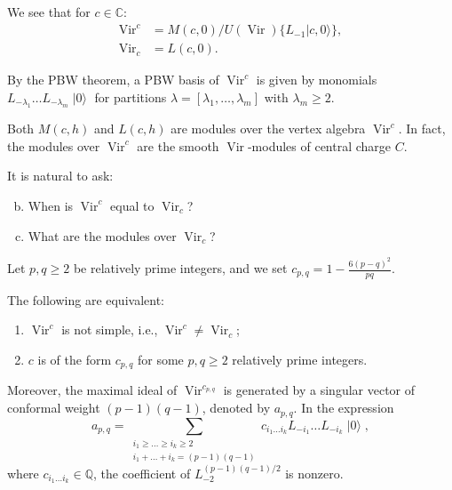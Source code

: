 \documentclass{beamer}
\DeclareMathOperator{\Vir}{Vir}
\DeclareMathOperator{\vac}{|0\rangle}
\begin{document}
\begin{frame}

  We see that for $c \in \mathbb{C}$:
  \begin{align*}
    \Vir^c &= M(c, 0)/U(\Vir)\{L_{-1}|c, 0\rangle\}, \\
    \Vir_c &= L(c, 0).
  \end{align*}

  By the PBW theorem, a PBW basis of $\Vir^c$ is given by monomials $L_{-\lambda_1}\dots L_{-\lambda_m}\vac$ for partitions $\lambda = [\lambda_1, \dots, \lambda_m]$ with $\lambda_m \ge 2$.

  \begin{example}[Modules over $\Vir^c$]
    \label{exa:2}
    Both $M(c, h)$ and $L(c, h)$ are modules over the vertex algebra $\Vir^c$.
    In fact, the modules over $\Vir^c$ are the smooth $\Vir$-modules of central charge $C$.
  \end{example}

  It is natural to ask:
  \begin{enumerate}[(a)]
    \setcounter{enumi}{1}
  \item When is $\Vir^c$ equal to $\Vir_c$?
  \item What are the modules over $\Vir_c$?
  \end{enumerate}

\end{frame}

\begin{frame}

  Let $p, q \ge 2$ be relatively prime integers, and we set $c_{p, q} = 1 - \frac{6(p - q)^2}{pq}$.

  \begin{theorem}
    \label{thr:3}
    The following are equivalent:
    \begin{enumerate}
    \item $\Vir^c$ is not simple, i.e., $\Vir^c \neq \Vir_c$;
    \item $c$ is of the form $c_{p, q}$ for some $p, q \ge 2$ relatively prime integers.
    \end{enumerate}
    Moreover, the maximal ideal of $\Vir^{c_{p, q}}$ is generated by a singular vector of conformal weight $(p - 1)(q - 1)$, denoted by $a_{p, q}$.
    In the expression
    \begin{equation*}
      a_{p, q} = \sum_{\substack{i_1 \ge \dots \ge i_k \ge 2 \\ i_1 + \dots + i_k = (p - 1)(q - 1)}}c_{i_1\dots i_k}L_{-i_1}\dots L_{-i_k}\vac,
    \end{equation*}
    where $c_{i_1\dots i_k} \in \mathbb{Q}$, the coefficient of $L_{-2}^{(p - 1)(q - 1)/2}$ is nonzero.
  \end{theorem}

\end{frame}
\end{document}
